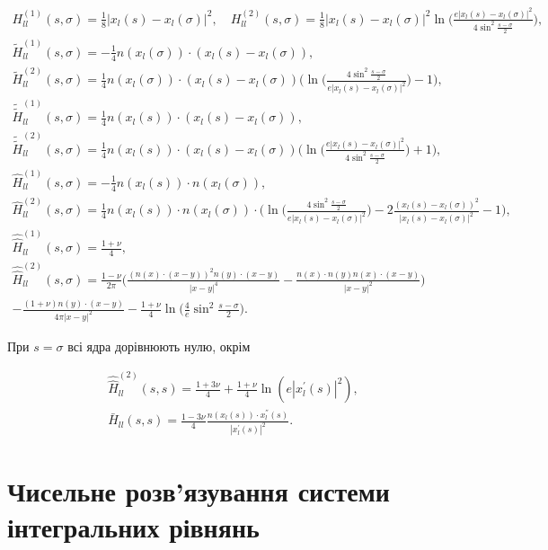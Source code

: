 \documentclass[12pt]{report}
\begin{document}
\begin{gather*}
	H^{(1)}_{ll}(s, \sigma)=\frac{1}{8}|x_l(s)-x_l(\sigma)|^2, \quad H^{(2)}_{ll}(s, \sigma)=\frac{1}{8}|x_l(s)-x_l(\sigma)|^2\ln\Big(\frac{e|x_l(s)-x_l(\sigma)|^2}{4\sin^2\frac{s-\sigma}{2}}\Big), \\
	\tilde{H}^{(1)}_{ll}(s, \sigma)=-\frac{1}{4}n(x_l(\sigma))\cdot(x_l(s)-x_l(\sigma)), \\
	 \tilde{H}^{(2)}_{ll}(s, \sigma)= \frac{1}{4}n(x_l(\sigma))\cdot(x_l(s)-x_l(\sigma))\bigg(\ln\Big(\frac{4\sin^2\frac{s-\sigma}{2}}{e|x_l(s)-x_l(\sigma)|^2}\Big)-1\bigg),\\
	\tilde{\tilde{H}}^{(1)}_{ll}(s, \sigma)=\frac{1}{4}n(x_l(s))\cdot(x_l(s)-x_l(\sigma)), \\
	 \tilde{\tilde{H}}^{(2)}_{ll}(s, \sigma)= \frac{1}{4}n(x_l(s))\cdot(x_l(s)-x_l(\sigma))\bigg(\ln\Big(\frac{e|x_l(s)-x_l(\sigma)|^2}{4\sin^2\frac{s-\sigma}{2}}\Big)+1\bigg),\\
	\hat{H}^{(1)}_{ll}(s, \sigma)= -\frac{1}{4}n(x_l(s))\cdot n(x_l(\sigma)), \\
	 \hat{H}^{(2)}_{ll}(s, \sigma)=\frac{1}{4}n(x_l(s))\cdot n(x_l(\sigma))\cdot\bigg(\ln\Big(\frac{4\sin^2\frac{s-\sigma}{2}}{e|x_l(s)-x_l(\sigma)|^2}\Big)-2\frac{(x_l(s)-x_l(\sigma))^2}{|x_l(s)-x_l(\sigma)|^2} -1\bigg), \\
	 \hat{\hat{H}}^{(1)}_{ll}(s, \sigma)= \frac{1+\nu}{4}, \\
	 \hat{\hat{H}}^{(2)}_{ll}(s, \sigma) = \frac{1-\nu}{2\pi}\Big(\frac{(n(x)\cdot(x-y))^2n(y)\cdot(x-y)}{|x-y|^4}-\frac{n(x)\cdot n(y)n(x)\cdot(x-y)}{|x-y|^2} \Big) \\
	-\frac{(1+\nu)n(y)\cdot(x-y)}{4\pi|x-y|^2}-\frac{1+\nu}{4}\ln\bigg(\frac{4}{e}\sin^2\frac{s-\sigma}{2}\bigg).
 \end{gather*}
 
 При $s=\sigma$ всі ядра дорівнюють нулю, окрім 
 
 \begin{gather*}
	\hat{\hat{H}}^{(2)}_{ll}(s, s) = \frac{1+3\nu}{4}+\frac{1+\nu}{4}\ln(e|x_l^{'}(s)|^2), \\
	\bar{H}_{ll}(s,s)=\frac{1-3\nu}{4}\frac{n(x_l(s))\cdot x_l^{''}(s)}{|x_l^{'}(s)|^2}.
 \end{gather*}
 
\section{Чисельне розв'язування системи інтегральних рівнянь}
\end{document}
